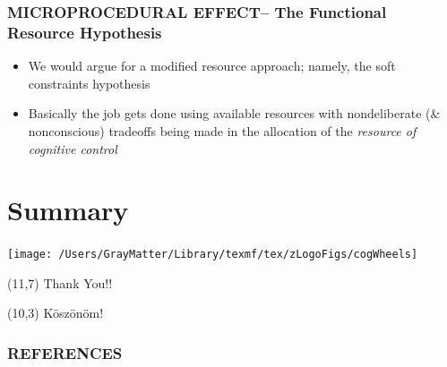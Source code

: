 \documentclass{beamer}
\begin{document}
\begin{frame}
	\frametitle{MICROPROCEDURAL EFFECT-- The Functional Resource Hypothesis}
	\begin{itemize}[<+-| alert@+>]
		\item We would argue for a modified resource approach; namely, the soft constraints hypothesis
		\item Basically the job gets done using available resources with nondeliberate (\& nonconscious) tradeoffs being made in the allocation of the \emph{\textcolor{wdgRed}{resource of cognitive control}}
	\end{itemize}
\end{frame}

\section{Summary}


\begin{frame}
	\texttt{[image: /Users/GrayMatter/Library/texmf/tex/zLogoFigs/cogWheels]}
	\begin{textblock}{4}(11,7)
		\LARGE{\textcolor{wdgRed}{Thank You!!}}
	\end{textblock}
		
	\begin{textblock}{5}(10,3)
		\LARGE{\textcolor{wdgRed}{K\"osz\"on\"om!}}
	\end{textblock}
\end{frame}

\begin{frame}[allowframebreaks]
	\frametitle{REFERENCES}
	\printbibliography
\end{frame}
\end{document}
